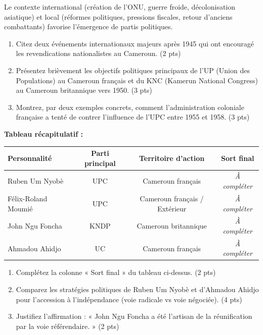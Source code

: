 \documentclass[11pt]{article}
\begin{document}
\begin{exercice}
Le contexte international (création de l'ONU, guerre froide, décolonisation asiatique) et local (réformes politiques, pressions fiscales, retour d'anciens combattants) favorise l'émergence de partis politiques.

\begin{enumerate}
    \item Citez deux événements internationaux majeurs après 1945 qui ont encouragé les revendications nationalistes au Cameroun. (2 pts)
    \item Présentez brièvement les objectifs politiques principaux de l'UP (Union des Populations) au Cameroun français et du KNC (Kamerun National Congress) au Cameroun britannique vers 1950. (3 pts)
    \item Montrez, par deux exemples concrets, comment l'administration coloniale française a tenté de contrer l'influence de l'UPC entre 1955 et 1958. (3 pts)
\end{enumerate}
\end{exercice}

\begin{exercice}
\textbf{Tableau récapitulatif :}

\begin{tabular}{|l|c|c|c|}
\hline
\textbf{Personnalité} & \textbf{Parti principal} & \textbf{Territoire d'action} & \textbf{Sort final} \\
\hline
Ruben Um Nyobè & UPC & Cameroun français & \textit{À compléter} \\
\hline
Félix-Roland Moumié & UPC & Cameroun français / Extérieur & \textit{À compléter} \\
\hline
John Ngu Foncha & KNDP & Cameroun britannique & \textit{À compléter} \\
\hline
Ahmadou Ahidjo & UC & Cameroun français & \textit{À compléter} \\
\hline
\end{tabular}

\begin{enumerate}
    \item Complétez la colonne « Sort final » du tableau ci-dessus. (2 pts)
    \item Comparez les stratégies politiques de Ruben Um Nyobè et d'Ahmadou Ahidjo pour l'accession à l'indépendance (voie radicale vs voie négociée). (4 pts)
    \item Justifiez l'affirmation : « John Ngu Foncha a été l'artisan de la réunification par la voie référendaire. » (2 pts)
\end{enumerate}
\end{exercice}
\end{document}
